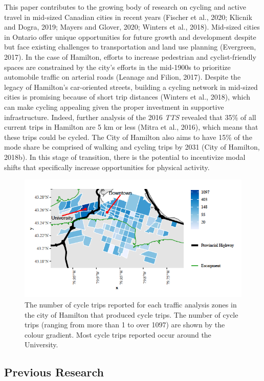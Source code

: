 \documentclass[]{elsarticle} %
\begin{document}
This paper contributes to the growing body of research on cycling and
active travel in mid-sized Canadian cities in recent years (Fischer et
al., 2020; Klicnik and Dogra, 2019; Mayers and Glover, 2020; Winters et
al., 2018). Mid-sized cities in Ontario offer unique opportunities for
future growth and development despite but face existing challenges to
transportation and land use planning (Evergreen, 2017). In the case of
Hamilton, efforts to increase pedestrian and cyclist-friendly spaces are
constrained by the city's efforts in the mid-1900s to prioritize
automobile traffic on arterial roads (Leanage and Filion, 2017). Despite
the legacy of Hamilton's car-oriented streets, building a cycling
network in mid-sized cities is promising because of short trip distances
(Winters et al., 2018), which can make cycling appealing given the
proper investment in supportive infrastructure. Indeed, further analysis
of the 2016 \emph{TTS} revealed that 35\% of all current trips in
Hamilton are 5 km or less (Mitra et al., 2016), which means that these
trips could be cycled. The City of Hamilton also aims to have 15\% of
the mode share be comprised of walking and cycling trips by 2031 (City
of Hamilton, 2018b). In this stage of transition, there is the potential
to incentivize modal shifts that specifically increase opportunities for
physical activity.

\begin{figure}

{\centering \includegraphics[width=0.65\linewidth]{TAZ-Hamilton} 

}

\caption{The number of cycle trips reported for each traffic analysis zones in the city of Hamilton that produced cycle trips. The number of cycle trips (ranging from more than 1 to over 1097) are shown by the colour gradient. Most cycle trips reported occur around the University.}\label{fig:figure-1}
\end{figure}

\hypertarget{previous-research}{%
\subsection{Previous Research}\label{previous-research}}
\end{document}
